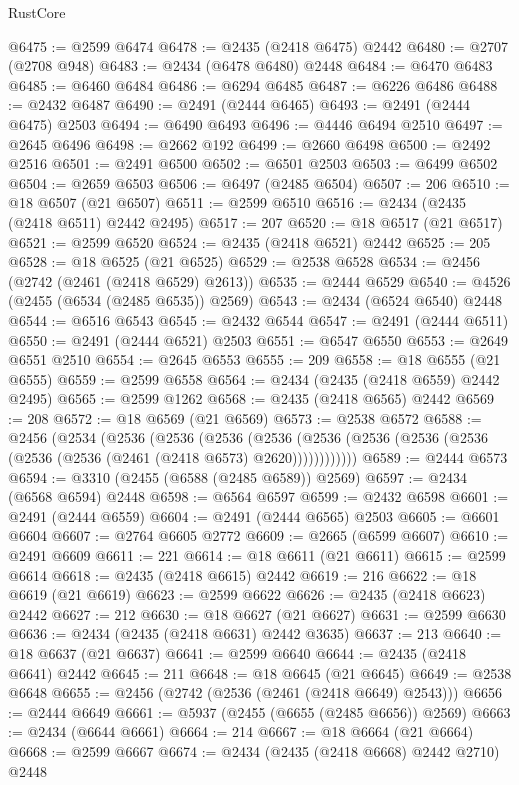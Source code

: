 \begin{lexlean}{RustCore}
\begin{coremodule}
@6475 := @2599 @6474
@6478 := @2435 (@2418 @6475) @2442
@6480 := @2707 (@2708 @948)
@6483 := @2434 (@6478 @6480) @2448
@6484 := @6470 @6483
@6485 := @6460 @6484
@6486 := @6294 @6485
@6487 := @6226 @6486
@6488 := @2432 @6487
@6490 := @2491 (@2444 @6465)
@6493 := @2491 (@2444 @6475) @2503
@6494 := @6490 @6493
@6496 := @4446 @6494 @2510
@6497 := @2645 @6496
@6498 := @2662 @192
@6499 := @2660 @6498
@6500 := @2492 @2516
@6501 := @2491 @6500
@6502 := @6501 @2503
@6503 := @6499 @6502
@6504 := @2659 @6503
@6506 := @6497 (@2485 @6504)
@6507 := 206
@6510 := @18 @6507 (@21 @6507)
@6511 := @2599 @6510
@6516 := @2434 (@2435 (@2418 @6511) @2442 @2495)
@6517 := 207
@6520 := @18 @6517 (@21 @6517)
@6521 := @2599 @6520
@6524 := @2435 (@2418 @6521) @2442
@6525 := 205
@6528 := @18 @6525 (@21 @6525)
@6529 := @2538 @6528
@6534 := @2456 (@2742 (@2461 (@2418 @6529) @2613))
@6535 := @2444 @6529
@6540 := @4526 (@2455 (@6534 (@2485 @6535)) @2569)
@6543 := @2434 (@6524 @6540) @2448
@6544 := @6516 @6543
@6545 := @2432 @6544
@6547 := @2491 (@2444 @6511)
@6550 := @2491 (@2444 @6521) @2503
@6551 := @6547 @6550
@6553 := @2649 @6551 @2510
@6554 := @2645 @6553
@6555 := 209
@6558 := @18 @6555 (@21 @6555)
@6559 := @2599 @6558
@6564 := @2434 (@2435 (@2418 @6559) @2442 @2495)
@6565 := @2599 @1262
@6568 := @2435 (@2418 @6565) @2442
@6569 := 208
@6572 := @18 @6569 (@21 @6569)
@6573 := @2538 @6572
@6588 := @2456
    (@2534
      (@2536
        (@2536
          (@2536
            (@2536 (@2536 (@2536 (@2536 (@2536 (@2536 (@2536 (@2461 (@2418 @6573) @2620))))))))))))
@6589 := @2444 @6573
@6594 := @3310 (@2455 (@6588 (@2485 @6589)) @2569)
@6597 := @2434 (@6568 @6594) @2448
@6598 := @6564 @6597
@6599 := @2432 @6598
@6601 := @2491 (@2444 @6559)
@6604 := @2491 (@2444 @6565) @2503
@6605 := @6601 @6604
@6607 := @2764 @6605 @2772
@6609 := @2665 (@6599 @6607)
@6610 := @2491 @6609
@6611 := 221
@6614 := @18 @6611 (@21 @6611)
@6615 := @2599 @6614
@6618 := @2435 (@2418 @6615) @2442
@6619 := 216
@6622 := @18 @6619 (@21 @6619)
@6623 := @2599 @6622
@6626 := @2435 (@2418 @6623) @2442
@6627 := 212
@6630 := @18 @6627 (@21 @6627)
@6631 := @2599 @6630
@6636 := @2434 (@2435 (@2418 @6631) @2442 @3635)
@6637 := 213
@6640 := @18 @6637 (@21 @6637)
@6641 := @2599 @6640
@6644 := @2435 (@2418 @6641) @2442
@6645 := 211
@6648 := @18 @6645 (@21 @6645)
@6649 := @2538 @6648
@6655 := @2456 (@2742 (@2536 (@2461 (@2418 @6649) @2543)))
@6656 := @2444 @6649
@6661 := @5937 (@2455 (@6655 (@2485 @6656)) @2569)
@6663 := @2434 (@6644 @6661)
@6664 := 214
@6667 := @18 @6664 (@21 @6664)
@6668 := @2599 @6667
@6674 := @2434 (@2435 (@2418 @6668) @2442 @2710) @2448

\end{coremodule}
\end{lexlean}
